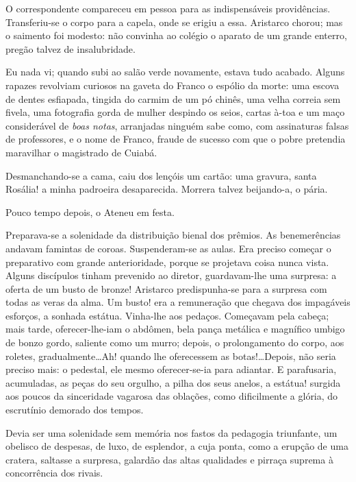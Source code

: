 
O correspondente compareceu em pessoa para
as indispensáveis providências. Transferiu{}-se o corpo para a capela,
onde se erigiu a essa. Aristarco chorou; mas o saimento foi modesto:
não convinha ao colégio o aparato de um grande enterro, pregão talvez
de insalubridade. 

Eu nada vi; quando subi ao salão verde novamente,
estava tudo acabado. Alguns rapazes revolviam curiosos na gaveta do
Franco o espólio da morte: uma escova de dentes esfiapada, tingida do
carmim de um pó chinês, uma velha correia sem fivela, uma fotografia
gorda de mulher despindo os seios, cartas à{}-toa e um maço
considerável de \textit{boas notas}, arranjadas ninguém sabe como, com
assinaturas falsas de professores, e o nome de Franco, fraude de
sucesso com que o pobre pretendia maravilhar o magistrado de Cuiabá.

Desmanchando{}-se a cama, caiu dos lençóis um cartão: uma gravura,
santa Rosália! a minha padroeira desaparecida. Morrera talvez
beijando{}-a, o pária. 

Pouco tempo depois, o Ateneu em festa.

Preparava{}-se a solenidade da distribuição bienal dos prêmios. As
benemerências andavam famintas de coroas. Suspenderam{}-se as aulas.
Era preciso começar o preparativo com grande anterioridade, porque se
projetava coisa nunca vista. Alguns discípulos tinham prevenido ao
diretor, guardavam{}-lhe uma surpresa: a oferta de um busto de bronze!
Aristarco predispunha{}-se para a surpresa com todas as veras da alma.
Um busto! era a remuneração que chegava dos impagáveis esforços, a
sonhada estátua. Vinha{}-lhe aos pedaços. Começavam pela cabeça; mais
tarde, oferecer{}-lhe{}-iam o abdômen, bela pança metálica e magnífico
umbigo de bonzo gordo, saliente como um murro; depois, o prolongamento
do corpo, aos roletes, gradualmente\ldots Ah! quando lhe oferecessem as
botas!\ldots Depois, não seria preciso mais: o pedestal, ele mesmo
oferecer{}-se{}-ia para adiantar. E parafusaria, acumuladas, as peças
do seu orgulho, a pilha dos seus anelos, a estátua! surgida aos poucos
da sinceridade vagarosa das oblações, como dificilmente a glória, do
escrutínio demorado dos tempos. 

Devia ser uma solenidade sem memória
nos fastos da pedagogia triunfante, um obelisco de despesas, de luxo,
de esplendor, a cuja ponta, como a erupção de uma cratera, saltasse a
surpresa, galardão das altas qualidades e pirraça suprema à
concorrência dos rivais. 

